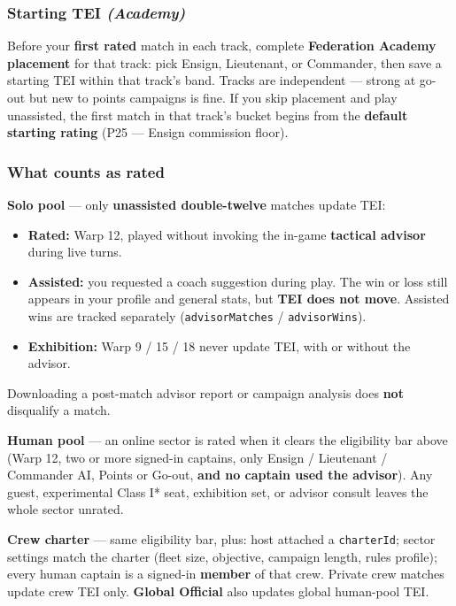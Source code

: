 \documentclass[11pt]{article}
\providecommand{\tightlist}{%
  \setlength{\itemsep}{0pt}\setlength{\parskip}{0pt}}
\begin{document}
\subsubsection{\texorpdfstring{Starting TEI
\emph{(Academy)}}{Starting TEI (Academy)}}\label{starting-tei-academy}

Before your \textbf{first rated} match in each track, complete
\textbf{Federation Academy placement} for that track: pick Ensign,
Lieutenant, or Commander, then save a starting TEI within that track's
band. Tracks are independent --- strong at go-out but new to points
campaigns is fine. If you skip placement and play unassisted, the first
match in that track's bucket begins from the \textbf{default starting rating} (P25 --- Ensign commission floor).

\subsubsection{What counts as rated}\label{what-counts-as-rated}

\textbf{Solo pool} --- only \textbf{unassisted double-twelve} matches
update TEI:

\begin{itemize}
\tightlist
\item
  \textbf{Rated:} Warp 12, played without invoking the in-game
  \textbf{tactical advisor} during live turns.
\item
  \textbf{Assisted:} you requested a coach suggestion during play. The
  win or loss still appears in your profile and general stats, but
  \textbf{TEI does not move}. Assisted wins are tracked separately
  (\texttt{advisorMatches} / \texttt{advisorWins}).
\item
  \textbf{Exhibition:} Warp 9 / 15 / 18 never update TEI, with or
  without the advisor.
\end{itemize}

Downloading a post-match advisor report or campaign analysis does
\textbf{not} disqualify a match.

\textbf{Human pool} --- an online sector is rated when it clears the
eligibility bar above (Warp 12, two or more signed-in captains, only
Ensign / Lieutenant / Commander AI, Points or Go-out, \textbf{and no captain used
the advisor}). Any guest, experimental Class I* seat, exhibition set, or
advisor consult leaves the whole sector unrated.

\textbf{Crew charter} --- same eligibility bar, plus: host attached a
\texttt{charterId}; sector settings match the charter (fleet size,
objective, campaign length, rules profile); every human captain is a
signed-in \textbf{member} of that crew. Private crew matches update crew
TEI only. \textbf{Global Official} also updates global human-pool TEI.
\end{document}
